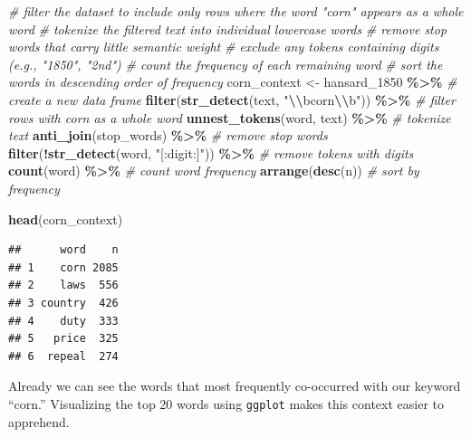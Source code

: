 \documentclass[
]{article}
\newenvironment{Shaded}{\begin{snugshade}}{\end{snugshade}}
\newcommand{\CommentTok}[1]{\textcolor[rgb]{0.56,0.35,0.01}{\textit{#1}}}
\newcommand{\FunctionTok}[1]{\textcolor[rgb]{0.13,0.29,0.53}{\textbf{#1}}}
\newcommand{\NormalTok}[1]{#1}
\newcommand{\OtherTok}[1]{\textcolor[rgb]{0.56,0.35,0.01}{#1}}
\newcommand{\SpecialCharTok}[1]{\textcolor[rgb]{0.81,0.36,0.00}{\textbf{#1}}}
\newcommand{\StringTok}[1]{\textcolor[rgb]{0.31,0.60,0.02}{#1}}
\begin{document}
\begin{Shaded}
\begin{Highlighting}[]
\CommentTok{\# filter the dataset to include only rows where the word "corn" appears as a whole word}
\CommentTok{\# tokenize the filtered text into individual lowercase words}
\CommentTok{\# remove stop words that carry little semantic weight}
\CommentTok{\# exclude any tokens containing digits (e.g., "1850", "2nd")}
\CommentTok{\# count the frequency of each remaining word}
\CommentTok{\# sort the words in descending order of frequency}
\NormalTok{corn\_context }\OtherTok{\textless{}{-}}\NormalTok{ hansard\_1850 }\SpecialCharTok{\%\textgreater{}\%} \CommentTok{\# create a new data frame}
  \FunctionTok{filter}\NormalTok{(}\FunctionTok{str\_detect}\NormalTok{(text, }\StringTok{"}\SpecialCharTok{\textbackslash{}\textbackslash{}}\StringTok{bcorn}\SpecialCharTok{\textbackslash{}\textbackslash{}}\StringTok{b"}\NormalTok{)) }\SpecialCharTok{\%\textgreater{}\%} \CommentTok{\# filter rows with \textquotesingle{}corn\textquotesingle{} as a whole word}
  \FunctionTok{unnest\_tokens}\NormalTok{(word, text) }\SpecialCharTok{\%\textgreater{}\%} \CommentTok{\# tokenize text}
  \FunctionTok{anti\_join}\NormalTok{(stop\_words) }\SpecialCharTok{\%\textgreater{}\%} \CommentTok{\# remove stop words}
  \FunctionTok{filter}\NormalTok{(}\SpecialCharTok{!}\FunctionTok{str\_detect}\NormalTok{(word, }\StringTok{"[:digit:]"}\NormalTok{)) }\SpecialCharTok{\%\textgreater{}\%} \CommentTok{\# remove tokens with digits}
  \FunctionTok{count}\NormalTok{(word) }\SpecialCharTok{\%\textgreater{}\%} \CommentTok{\# count word frequency}
  \FunctionTok{arrange}\NormalTok{(}\FunctionTok{desc}\NormalTok{(n)) }\CommentTok{\# sort by frequency}
\end{Highlighting}
\end{Shaded}

\begin{Shaded}
\begin{Highlighting}[]
\FunctionTok{head}\NormalTok{(corn\_context)}
\end{Highlighting}
\end{Shaded}

\begin{verbatim}
##      word    n
## 1    corn 2085
## 2    laws  556
## 3 country  426
## 4    duty  333
## 5   price  325
## 6  repeal  274
\end{verbatim}

Already we can see the words that most frequently co-occurred with our
keyword ``corn.'' Visualizing the top 20 words using \texttt{ggplot}
makes this context easier to apprehend.
\end{document}
